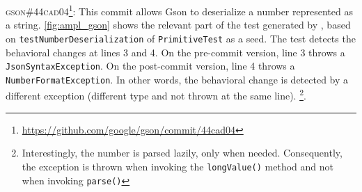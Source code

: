 \textsc{gson\#44cad04}\footnote{\url{https://github.com/google/gson/commit/44cad04}}: This commit allows Gson to deserialize a number represented as a string.
\autoref{fig:ampl_gson} shows the relevant part of the test generated by \DCII, based on \texttt{testNumberDeserialization} of \texttt{PrimitiveTest} as a seed.
The \DCI test detects the behavioral changes at lines 3 and 4.
On the pre-commit version, line 3 throws a \texttt{JsonSyntaxException}.
On the post-commit version, line 4 throws a \texttt{NumberFormatException}.
In other words, the behavioral change is detected by a different exception (different type and not thrown at the same line).
\footnote{Interestingly, the number is parsed lazily, only when needed. 
Consequently, the exception is thrown when invoking the \texttt{longValue()} method and not when invoking \texttt{parse()}}.

